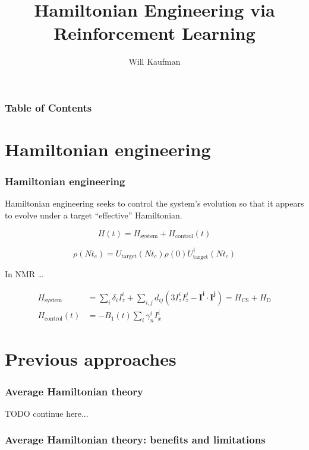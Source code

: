 \documentclass{beamer}
\title{Hamiltonian Engineering via Reinforcement Learning}
\author{Will Kaufman}
\institute{Ramanathan Group \\ Dartmouth College}
\begin{document}
\frame{\titlepage}

\begin{frame}
\frametitle{Table of Contents}
\tableofcontents
\end{frame}

\section{Hamiltonian engineering}

\begin{frame}
\frametitle{Hamiltonian engineering}

Hamiltonian engineering seeks to control the system's evolution so that it appears to evolve under a target ``effective'' Hamiltonian.

\begin{equation}
    H(t) = H_\text{system} + H_\text{control}(t)
\end{equation}

\begin{equation}\label{eq:strob_measure}
    \rho(Nt_c) = U_\text{target}(Nt_c) \rho(0) U_\text{target}^\dagger(Nt_c)
\end{equation}

\pause

In NMR \cite{1976ii}\dots

\begin{align}\label{eq:ham_spin}
    H_\text{system} &= \sum_i \delta_i I_z^i + \sum_{i,j} d_{ij} \left( 3I_z^iI_z^j - \mathbf{I^i} \cdot \mathbf{I^j} \right)
    = H_\text{CS} + H_\text{D} \\
    H_\text{control}(t) &= -B_1(t) \sum_i \gamma_n^i I_x^i
\end{align}

\end{frame}

\section{Previous approaches}

\begin{frame}
\frametitle{Average Hamiltonian theory}

TODO continue here...

\end{frame}

\begin{frame}
\frametitle{Average Hamiltonian theory: benefits and limitations}



\end{frame}
\end{document}
